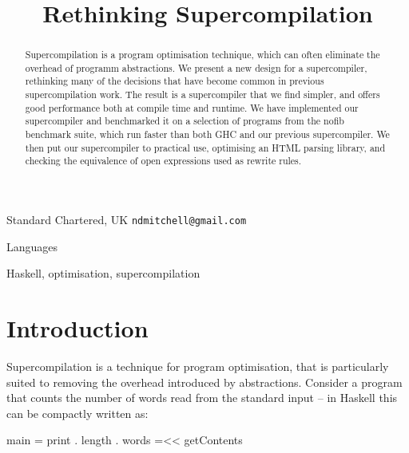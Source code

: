 \documentclass[draft]{sigplanconf}
\begin{document}

\titlebanner{\today{} - \currenttime{}}        %
\preprintfooter{}   %

\title{Rethinking Supercompilation}

           {Standard Chartered, UK}
           {\verb"ndmitchell@gmail.com"}

\maketitle

\begin{abstract}
Supercompilation is a program optimisation technique, which can often eliminate the overhead of programm abstractions. We present a new design for a supercompiler, rethinking many of the decisions that have become common in previous supercompilation work. The result is a supercompiler that we find simpler, and offers good performance both at compile time and runtime. We have implemented our supercompiler and benchmarked it on a selection of programs from the nofib benchmark suite, which run faster than both GHC and our previous supercompiler. We then put our supercompiler to practical use, optimising an HTML parsing library, and checking the equivalence of open expressions used as rewrite rules.
\end{abstract}


\terms
Languages

\keywords
Haskell, optimisation, supercompilation

\section{Introduction}


Supercompilation is a technique for program optimisation, that is particularly suited to removing the overhead introduced by abstractions. Consider a program that counts the number of words read from the standard input -- in Haskell \cite{haskell} this can be compactly written as:

\begin{code}
main = print . length . words =<< getContents
\end{code}
\end{document}
